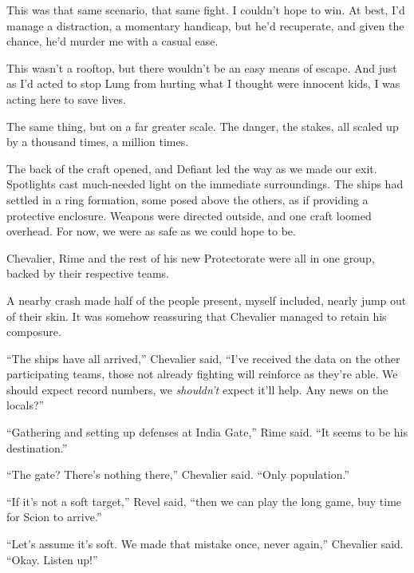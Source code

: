This was that same scenario, that same fight.  I couldn't hope to win.  At best, I'd manage a distraction, a momentary handicap, but he'd recuperate, and given the chance, he'd murder me with a casual ease.



This wasn't a rooftop, but there wouldn't be an easy means of escape.  And just as I'd acted to stop Lung from hurting what I thought were innocent kids, I was acting here to save lives.



The same thing, but on a far greater scale.  The danger, the stakes, all scaled up by a thousand times, a million times.



The back of the craft opened, and Defiant led the way as we made our exit.  Spotlights cast much-needed light on the immediate surroundings.  The ships had settled in a ring formation, some posed above the others, as if providing a protective enclosure.  Weapons were directed outside, and one craft loomed overhead.  For now, we were as safe as we could hope to be.



Chevalier, Rime and the rest of his new Protectorate were all in one group, backed by their respective teams.



A nearby crash made half of the people present, myself included, nearly jump out of their skin.  It was somehow reassuring that Chevalier managed to retain his composure.



``The ships have all arrived,'' Chevalier said, ``I've received the data on the other participating teams, those not already fighting will reinforce as they're able.  We should expect record numbers, we \emph{shouldn't }expect it'll help.  Any news on the locals?''



``Gathering and setting up defenses at India Gate,'' Rime said.  ``It seems to be his destination.''



``The gate?  There's nothing there,'' Chevalier said.  ``Only population.''



``If it's not a soft target,'' Revel said, ``then we can play the long game, buy time for Scion to arrive.''



``Let's assume it's soft.  We made that mistake once, never again,'' Chevalier said.  ``Okay.  Listen up!''



